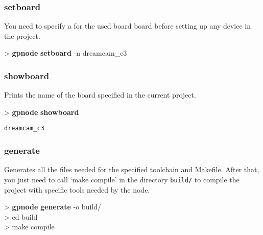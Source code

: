 \documentclass[10pt,a4paper]{article}
\begin{document}
\subsubsection{setboard}

You need to specify a for the used board board before setting up any device in the project.\\


\begin{sampletitle}
> \textbf{gpnode} \textbf{setboard} -n dreamcam\_c3
\end{sampletitle}


\subsubsection{showboard}

Prints the name of the board specified in the current project.

\begin{sampletitle}
> \textbf{gpnode} \textbf{showboard}
\begin{Verbatim}
dreamcam_c3
\end{Verbatim}
\end{sampletitle}


\subsubsection{generate}

Generates all the files needed for the specified toolchain and Makefile. After that, you just need to call `make compile' in the directory \texttt{build/} to compile the project with specific tools needed by the node.\\


\begin{sampletitle}
> \textbf{gpnode} \textbf{generate} -o build/\\
> cd build\\
> make compile
\end{sampletitle}
\end{document}
